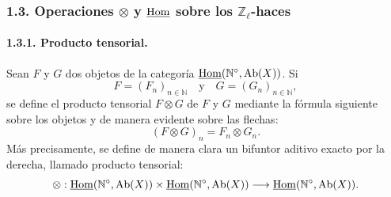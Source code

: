 \subsubsection*{1.3. Operaciones \(\otimes\) y \(\underline{\operatorname{Hom}}\) sobre los \(\mathbb Z_\ell\)-haces}

\paragraph{1.3.1. Producto tensorial.}
Sean \(F\) y \(G\) dos objetos de la categoría \(\underline{\operatorname{Hom}}(\mathbb N^\circ,\operatorname{Ab}(X))\). Si
\[
F=(F_n)_{n\in\mathbb N}\quad\text{y}\quad G=(G_n)_{n\in\mathbb N},
\]
se define el producto tensorial \(F\otimes G\) de \(F\) y \(G\) mediante la fórmula siguiente sobre los objetos y de manera evidente sobre las flechas:
\[
(F\otimes G)_n=F_n\otimes G_n.
\]
Más precisamente, se define de manera clara un bifuntor aditivo exacto por la derecha, llamado producto tensorial:
\[
\otimes:\underline{\operatorname{Hom}}(\mathbb N^\circ,\operatorname{Ab}(X))\times \underline{\operatorname{Hom}}(\mathbb N^\circ,\operatorname{Ab}(X))
\longrightarrow \underline{\operatorname{Hom}}(\mathbb N^\circ,\operatorname{Ab}(X)).
\]
